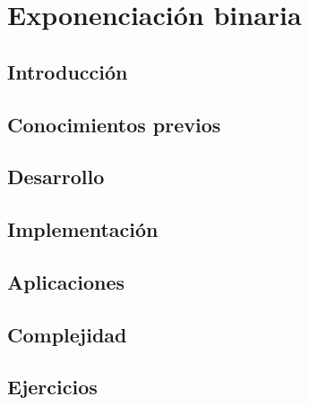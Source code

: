 \chapter{Exponenciación binaria}
\section{Introducción}

\section{Conocimientos previos}

\section{Desarrollo}

\section{Implementación}

\section{Aplicaciones}

\section{Complejidad}

\section{Ejercicios}
